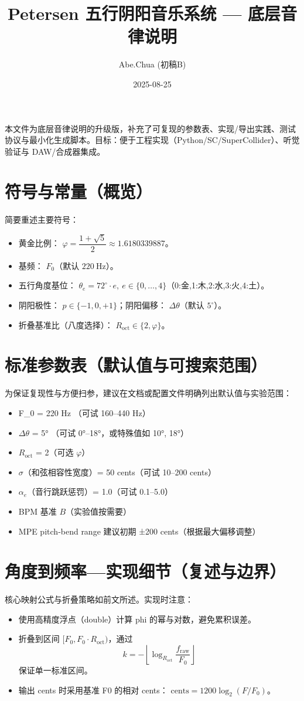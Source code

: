 \documentclass{article}
\title{Petersen 五行阴阳音乐系统 — 底层音律说明}
\author{Abe.Chua (初稿B)}
\date{2025-08-25}
\begin{document}
\maketitle

本文件为底层音律说明的升级版，补充了可复现的参数表、实现/导出实践、测试协议与最小化生成脚本。目标：便于工程实现（Python/SC/SuperCollider）、听觉验证与 DAW/合成器集成。

\section{符号与常量（概览）}
简要重述主要符号：
\begin{itemize}
  \item 黄金比例： $\varphi=\dfrac{1+\sqrt{5}}{2}\approx1.6180339887$。
  \item 基频： $F_0$（默认 $220\ \mathrm{Hz}$）。
  \item 五行角度基位： $\theta_e=72^\circ\cdot e,\ e\in\{0,\dots,4\}$（0:金,1:木,2:水,3:火,4:土）。
  \item 阴阳极性： $p\in\{-1,0,+1\}$；阴阳偏移： $\Delta\theta$（默认 $5^\circ$）。
  \item 折叠基准比（八度选择）： $R_{\mathrm{oct}}\in\{2,\varphi\}$。
\end{itemize}

\section{标准参数表（默认值与可搜索范围）}
为保证复现性与方便扫参，建议在文档或配置文件明确列出默认值与实验范围：
\begin{itemize}
  \item F\_0 = 220 Hz （可试 160–440 Hz）
  \item $\Delta\theta$ = 5° （可试 0°–18°，或特殊值如 10°, 18°）
  \item $R_{\mathrm{oct}}$ = 2（可选 $\varphi$）
  \item $\sigma$（和弦相容性宽度）= 50 cents（可试 10–200 cents）
  \item $\alpha_e$（音行跳跃惩罚）= 1.0（可试 0.1–5.0）
  \item BPM 基准 $B$（实验值按需要）
  \item MPE pitch‑bend range 建议初期 ±200 cents（根据最大偏移调整）
\end{itemize}

\section{角度到频率—实现细节（复述与边界）}
核心映射公式与折叠策略如前文所述。实现时注意：
\begin{itemize}
  \item 使用高精度浮点（double）计算 phi 的幂与对数，避免累积误差。
  \item 折叠到区间 $[F_0, F_0\cdot R_{\mathrm{oct}})$，通过
  \[
    k = -\left\lfloor \log_{R_{\mathrm{oct}}}\dfrac{f_{\mathrm{raw}}}{F_{0}} \right\rfloor
  \]
  保证单一标准区间。
  \item 输出 cents 时采用基准 F0 的相对 cents： $\mathrm{cents}=1200\log_2(F/F_0)$。
\end{itemize}
\end{document}
